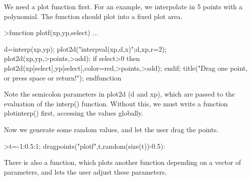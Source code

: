 \documentclass[a4paper,10pt]{article}
\begin{document}
\begin{eulernotebook}
\begin{eulercomment}
\begin{eulercomment}
\begin{eulercomment}
\begin{eulercomment}
\begin{eulercomment}
We need a plot function first. For an example, we interpolate in 5 points with a
polynomial. The function should plot into a fixed plot area.
\end{eulercomment}
\begin{eulerprompt}
>function plotf(xp,yp,select) ...
\end{eulerprompt}
\begin{eulerudf}
    d=interp(xp,yp);
    plot2d("interpval(xp,d,x)";d,xp,r=2);
    plot2d(xp,yp,>points,>add);
    if select>0 then
      plot2d(xp[select],yp[select],color=red,>points,>add);
    endif;
    title("Drag one point, or press space or return!");
  endfunction
\end{eulerudf}
\begin{eulercomment}
Note the semicolon parameters in plot2d (d and xp), which are passed to the evaluation
of the interp() function. Without this, we must write a function plotinterp() first,
accessing the values globally.

Now we generate some random values, and let the user drag the points.
\end{eulercomment}
\begin{eulerprompt}
>t=-1:0.5:1; dragpoints("plotf",t,random(size(t))-0.5):
\end{eulerprompt}
\begin{eulercomment}
There is also a function, which plots another function depending on a vector of
parameters, and lets the user adjust these parameters.


\end{eulercomment}
\end{eulercomment}
\end{eulercomment}
\end{eulercomment}
\end{eulercomment}
\end{eulernotebook}
\end{document}

